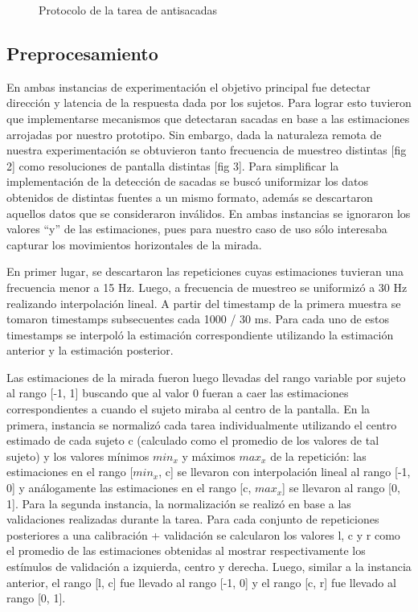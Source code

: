 \begin{figure}
    \centering
    \caption{Protocolo de la tarea de antisacadas}
    \label{fig:antisaccades-protocol}
\end{figure}

\subsection{Preprocesamiento} \label{section:method:preprocessing}

En ambas instancias de experimentación el objetivo principal fue detectar
dirección y latencia de la respuesta dada por los sujetos.
Para lograr esto tuvieron que implementarse mecanismos que detectaran sacadas
en base a las estimaciones arrojadas por nuestro prototipo.
Sin embargo, dada la naturaleza remota de nuestra experimentación se obtuvieron
tanto frecuencia de muestreo distintas [fig 2] como resoluciones de pantalla
distintas [fig 3].
Para simplificar la implementación de la detección de sacadas se buscó
uniformizar los datos obtenidos de distintas fuentes a un mismo formato, además
se descartaron aquellos datos que se consideraron inválidos.
En ambas instancias se ignoraron los valores “y” de las estimaciones, pues para
nuestro caso de uso sólo interesaba capturar los movimientos horizontales de la
mirada.

En primer lugar, se descartaron las repeticiones cuyas estimaciones tuvieran
una frecuencia menor a 15 Hz.
Luego, a frecuencia de muestreo se uniformizó a 30 Hz realizando interpolación
lineal.
A partir del timestamp de la primera muestra se tomaron timestamps subsecuentes
cada 1000 / 30 ms.
Para cada uno de estos timestamps se interpoló la estimación correspondiente
utilizando la estimación anterior y la estimación posterior. 

Las estimaciones de la mirada fueron luego llevadas del rango variable por
sujeto al rango [-1, 1] buscando que al valor 0 fueran a caer las estimaciones
correspondientes a cuando el sujeto miraba al centro de la pantalla.
En la primera, instancia se normalizó cada tarea individualmente utilizando el
centro estimado de cada sujeto c (calculado como el promedio de los valores de
tal sujeto) y los valores mínimos $min_x$ y máximos $max_x$ de la repetición:
las estimaciones en el rango [$min_x$, c] se llevaron con interpolación lineal
al rango [-1, 0] y análogamente las estimaciones en el rango [c, $max_x$] se
llevaron al rango [0, 1].
Para la segunda instancia, la normalización se realizó en base a las
validaciones realizadas durante la tarea.
Para cada conjunto de repeticiones posteriores a una calibración + validación
se calcularon los valores l, c y r como el promedio de las estimaciones
obtenidas al mostrar respectivamente los estímulos de validación a izquierda,
centro y derecha.
Luego, similar a la instancia anterior, el rango [l, c] fue llevado al rango
[-1, 0] y el rango [c, r] fue llevado al rango [0, 1].

